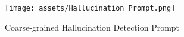 \begin{figure}
    \centering
    \texttt{[image: assets/Hallucination\_Prompt.png]}
    \caption{Coarse-grained Hallucination Detection Prompt}
    \label{fig:prompt}
\end{figure}